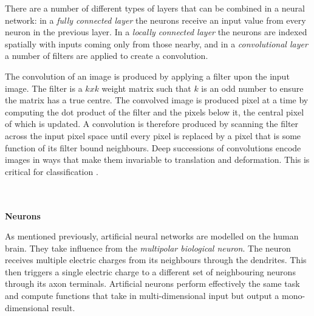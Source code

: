 \documentclass[a4paper,11pt,titlepage]{article}
\begin{document}
		\par 
		There are a number of different types of layers that can be combined in a neural network: in a \textit{fully connected layer} the neurons receive an input value from every neuron in the previous layer. In a \textit{locally connected layer} the neurons are indexed spatially with inputs coming only from those nearby, and in a \textit{convolutional layer} a number of filters are applied to create a convolution. 
		\par
		The convolution of an image is produced by applying a filter upon the input image. The filter is a $k x k$ weight matrix such that $ k $ is an odd number to ensure the matrix has a true centre. The convolved image is produced pixel at a time by computing the dot product of the filter and the pixels below it, the central pixel of which is updated. A convolution is therefore produced by scanning the filter across the input pixel space until every pixel is replaced by a pixel that is some function of its filter bound neighbours. Deep successions of convolutions encode images in ways that make them invariable to translation and deformation. This is critical for classification \cite{Bruna2012}.
\\\
\\\

\textbf{Neurons}
		
		\begin{figure}[H]
    			\centering	
    			\qquad
    			\caption{}%
    			\label{fig:biologicalNeurons}
		\end{figure}
				
		As mentioned previously, artificial neural networks are modelled on the human brain. They take influence from the \textit{multipolar biological neuron}. The neuron receives multiple electric charges from its neighbours through the dendrites. This then triggers a single electric charge to a different set of neighbouring neurons through its axon terminals. Artificial neurons perform effectively the same task and compute functions that take in multi-dimensional input but output a mono-dimensional result.
\\\
\end{document}
